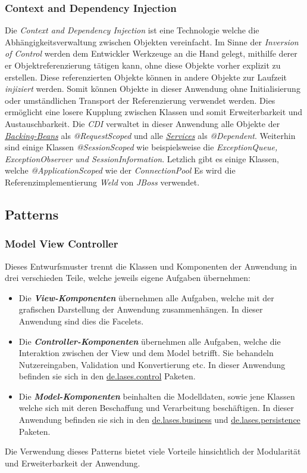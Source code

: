 \subsubsection{Context and Dependency Injection}
Die \emph{Context and Dependency Injection} ist eine Technologie welche die
Abhängigkeitsverwaltung zwischen Objekten vereinfacht. Im Sinne der
\emph{Inversion of Control} werden dem Entwickler Werkzeuge an die Hand gelegt, mithilfe derer
er Objektreferenzierung tätigen kann, ohne diese Objekte vorher explizit zu erstellen.
Diese referenzierten Objekte können in andere Objekte zur Laufzeit \emph{injiziert} werden.
Somit können Objekte in dieser Anwendung ohne Initialisierung oder umständlichen Transport der Referenzierung
verwendet werden.
Dies ermöglicht eine losere Kupplung zwischen Klassen und somit Erweiterbarkeit
und Austauschbarkeit.
Die \emph{CDI} verwaltet in dieser Anwendung alle Objekte der \emph{\hyperref[arch:backing]{Backing-Beans}}
als \emph{@RequestScoped}
und alle \emph{\hyperref[arch:service]{Services}} als \emph{@Dependent}.
Weiterhin sind einige Klassen \emph{@SessionScoped} wie beispielsweise
die \emph{ExceptionQueue, ExceptionObserver und SessionInformation}.
Letzlich gibt es einige Klassen, welche
\emph{@ApplicationScoped} wie der \emph{ConnectionPool} %
Es wird die Referenzimplementierung \emph{Weld} von \emph{JBoss} verwendet.

\subsection{Patterns}\label{arch:patterns}

\subsubsection{Model View Controller}\label{arch:mvc}
Dieses Entwurfsmuster trennt die Klassen und Komponenten der Anwendung in drei
verschieden Teile, welche jeweils eigene Aufgaben übernehmen:
\begin{itemize}
    \item Die \emph{\textbf{View-Komponenten}} übernehmen alle Aufgaben,
    welche mit der grafischen Darstellung der Anwendung zusammenhängen.
    In dieser Anwendung sind dies die Facelets. %
    \item Die \emph{\textbf{Controller-Komponenten}} übernehmen alle Aufgaben,
    welche die Interaktion zwischen der View und dem Model betrifft. Sie behandeln
    Nutzereingaben, Validation und Konvertierung etc. In dieser Anwendung befinden sie
    sich in den \hyperref[arch:control]{de.lases.control} Paketen.
    \item Die \emph{\textbf{Model-Komponenten}} beinhalten die Modelldaten, sowie jene
    Klassen welche sich mit deren Beschaffung und Verarbeitung beschäftigen. In dieser
    Anwendung befinden sie sich in den \hyperref[arch:business]{de.lases.business}
    und \hyperref[arch:persistence]{de.lases.persistence} Paketen.
\end{itemize}
Die Verwendung dieses Patterns bietet viele Vorteile hinsichtlich der Modularität
und Erweiterbarkeit der Anwendung.

